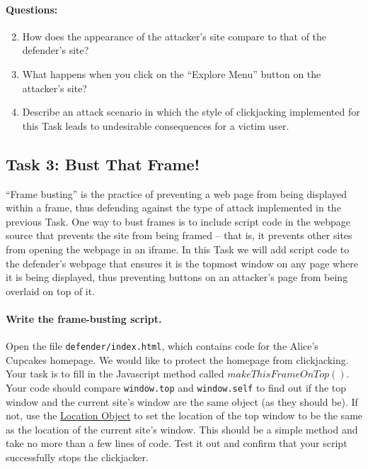 \paragraph{Questions:}
\begin{enumerate}
\setcounter{enumi}{1}
    \item How does the appearance of the attacker's site compare to that of
	  the defender's site?

    \item What happens when you click on the ``Explore Menu'' button on
    the attacker's site?

    \item Describe an attack scenario in which the style of 
    clickjacking implemented for this Task leads to undesirable 
    consequences for a victim user.
\end{enumerate}



\subsection{Task 3: Bust That Frame!}
``Frame busting'' is the practice of preventing a web page from being
displayed within a frame, thus defending against the type of attack
implemented in the previous Task.  One way to bust frames is to include
script code in the webpage source that prevents the site from being
framed -- that is, it prevents other sites from opening the webpage in
an iframe.  In this Task we will add script code to the defender's
webpage that ensures it is the topmost window on any page where it is
being displayed, thus preventing buttons on an attacker's page from
being overlaid on top of it. 

\paragraph{Write the frame-busting script.} 

Open the file \texttt{defender/index.html}, which contains code for the
Alice's Cupcakes homepage. We would like to protect the homepage from
clickjacking. Your task is to fill in the Javascript method called
$makeThisFrameOnTop()$. Your code should compare \texttt{window.top} and
\texttt{window.self} to find out if the top window and the current
site's window are the same object (as they should be). If not, use the
\href{https://developer.mozilla.org/en-US/docs/Web/API/Location}{Location
Object} to set the location of the top window to be the same as the
location of the current site's window. This should be a simple method
and take no more than a few lines of code. Test it out and confirm that
your script successfully stops the clickjacker. 

